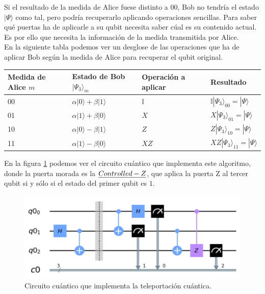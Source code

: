\documentclass[11pt]{article}
\newcommand{\I}{\mathbb{I}}
\newcommand{\ra}{\rangle}
\theoremstyle{plain}
\begin{document}
Si el resultado de la medida de Alice fuese distinto a $00$, Bob no tendría el estado $|\Psi\ra$ como tal, pero podría recuperarlo aplicando operaciones sencillas. Para saber qué puertas ha de aplicarle a su qubit necesita saber cúal es su contenido actual. Es por ello que necesita la información de la medida transmitida por Alice. \\

En la siguiente tabla podemos ver un desglose de las operaciones que ha de aplicar Bob según la medida de Alice para recuperar el qubit original.

\begin{table}[H]
	\begin{tabular}{llll}
		\textbf{Medida de Alice $m$} & \textbf{Estado de Bob $|\Psi_3\ra_m$} & \textbf{Operación a aplicar} & \textbf{Resultado}                               \\ \hline
		00                           & $\alpha|0\ra + \beta|1\ra$                            & $\I$                         & $\I |\Psi _3\ra_{00} = |\Psi\ra$ \\
		01                           & $\alpha|1\ra + \beta|0\ra$                            & $X$                          & $X |\Psi _3\ra_{01} = |\Psi\ra$  \\
		10                           & $\alpha|0\ra - \beta|1\ra$                            & $Z$                          & $Z |\Psi _3\ra_{10} = |\Psi\ra$  \\
		11                           & $\alpha|1\ra - \beta|0\ra$                            & $XZ$                         & $XZ |\Psi _3\ra_{11} = |\Psi\ra$
	\end{tabular}
\end{table}

En la figura \ref{fig-teleportation} podemos ver el circuito cuántico que implementa este algoritmo, donde la puerta morada es la $\emph{Controlled-Z}$, que aplica la puerta Z al tercer qubit si y sólo si el estado del primer qubit es $1$.

\begin{figure}[H]
	\centering
	\includegraphics[scale=0.7]{figures/teleportation-circuit.pdf}
	\caption{Circuito cuántico que implementa la teleportación cuántica.}
	\label{fig-teleportation}
\end{figure}
\end{document}
